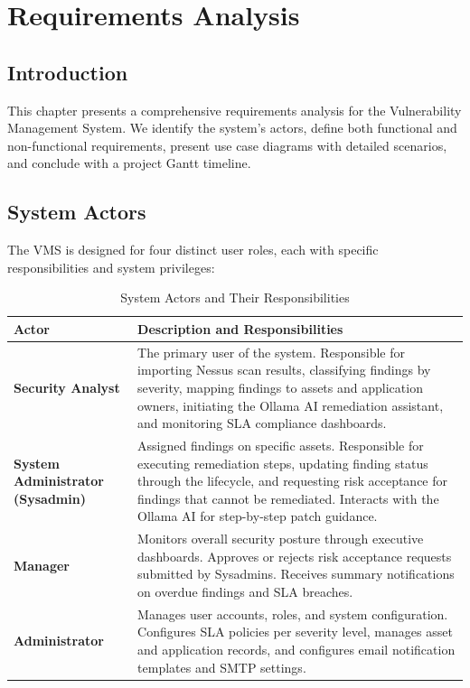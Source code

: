 \chapter{Requirements Analysis}
\label{chap:requirements}

\section{Introduction}

This chapter presents a comprehensive requirements analysis for the Vulnerability Management System. We identify the system's actors, define both functional and non-functional requirements, present use case diagrams with detailed scenarios, and conclude with a project Gantt timeline.

\section{System Actors}

The VMS is designed for four distinct user roles, each with specific responsibilities and system privileges:

\begin{table}[H]
\centering
\caption{System Actors and Their Responsibilities}
\label{tab:actors}
\begin{tabularx}{\linewidth}{lX}
\toprule
\textbf{Actor} & \textbf{Description and Responsibilities} \\
\midrule
\textbf{Security Analyst} &
The primary user of the system. Responsible for importing Nessus scan results, classifying findings by severity, mapping findings to assets and application owners, initiating the Ollama AI remediation assistant, and monitoring SLA compliance dashboards. \\[6pt]
\textbf{System Administrator (Sysadmin)} &
Assigned findings on specific assets. Responsible for executing remediation steps, updating finding status through the lifecycle, and requesting risk acceptance for findings that cannot be remediated. Interacts with the Ollama AI for step-by-step patch guidance. \\[6pt]
\textbf{Manager} &
Monitors overall security posture through executive dashboards. Approves or rejects risk acceptance requests submitted by Sysadmins. Receives summary notifications on overdue findings and SLA breaches. \\[6pt]
\textbf{Administrator} &
Manages user accounts, roles, and system configuration. Configures SLA policies per severity level, manages asset and application records, and configures email notification templates and SMTP settings. \\
\bottomrule
\end{tabularx}
\end{table}

